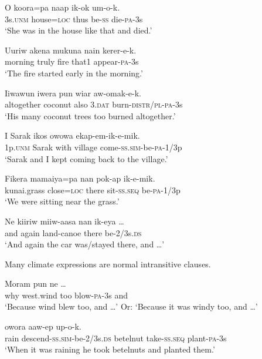 \ea%
\label{ex:5:x964}
\gll O  koora=pa  naap  ik-ok  um-o-k. \\
     3s.\textsc{unm}  house=\textsc{loc}  thus  be-\textsc{ss}  die-\textsc{pa}-3s \\
\glt `She was in the house like that and died.'
\z

\ea%
\label{ex:5:x959}
\gll Uuriw  akena  mukuna  nain  kerer-e-k. \\
     morning  truly  fire  that1  appear-\textsc{pa}-3s \\
\glt `The fire started early in the morning.'
\z

\ea%
\label{ex:5:x960}
\gll Iiwawun  iwera  pun  wiar  aw-omak-e-k. \\
     altogether  coconut  also  3.\textsc{dat}  burn-\textsc{distr}/\textsc{pl}-\textsc{pa}-3s \\
\glt `His many coconut trees too burned altogether.'
\z

\ea%
\label{ex:5:x965}
\gll I  Sarak  ikos  owowa  ekap-em-ik-e-mik. \\
     1p.\textsc{unm}  Sarak  with  village  come-\textsc{ss}.\textsc{sim}-be-\textsc{pa}-1/3p \\
\glt `Sarak and I kept coming back to the village.'
\z

\ea%
\label{ex:5:x962}
\gll Fikera  mamaiya=pa  nan  pok-ap  ik-e-mik. \\
     kunai.grass  close=\textsc{loc}  there  sit-\textsc{ss}.\textsc{seq}  be-\textsc{pa}-1/3p \\
\glt `We were sitting near the  grass.'
\z

\ea%
\label{ex:5:x968}
\gll Ne  kiiriw  miiw-aasa  nan  ik-eya  {\dots} \\
     and  again  land-canoe  there  be-2/3s.\textsc{ds} \\
\glt `And again the car was/stayed there, and {\dots}'
\z

Many climate expressions are normal intransitive clauses.

\ea%
\label{ex:5:x1020}
\gll Moram   pun    ne  {\dots} \\
     why  west.wind  too  blow-\textsc{pa}-3s  and \\
\glt `Because wind blew too, and {\dots}' Or: `Because it was windy too, and {\dots}'
\z

\ea%
\label{ex:5:x1022}
\gll {}   owora  aaw-ep  up-o-k. \\
     rain  descend-\textsc{ss}.\textsc{sim}-be-2/3s.\textsc{ds}  betelnut  take-\textsc{ss}.\textsc{seq}  plant-\textsc{pa}-3s \\
\glt `When it was raining he took betelnuts and planted them.'
\z

